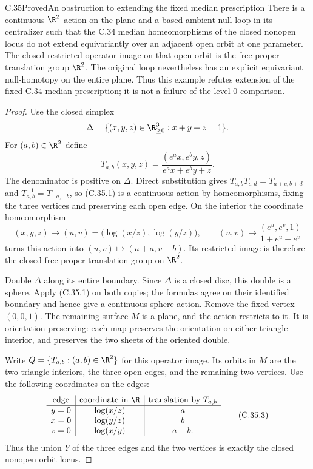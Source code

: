 \begin{claim}{C.35}{Proved}{An obstruction to extending the fixed median prescription}
There is a continuous $\R^2$-action on the plane and a based
ambient-null loop in its centralizer such that the C.34 median
homeomorphisms of the closed nonopen locus do not extend
equivariantly over an adjacent open orbit at one parameter.
The closed restricted operator image on that open orbit is
the free proper translation group $\R^2$.
The original loop nevertheless has an explicit equivariant
null-homotopy on the entire plane.
Thus this example refutes extension of the fixed C.34 median
prescription; it is not a failure of the level-$0$ comparison.
\end{claim}
\begin{proof}
Use the closed simplex
\[
 \Delta=\{(x,y,z)\in\R_{\geq0}^3:x+y+z=1\}.
\]
For $(a,b)\in\R^2$ define
\[
 T_{a,b}(x,y,z)
   =\frac{(e^a x,e^b y,z)}{e^a x+e^b y+z}.
                                                        \tag{C.35.1}
\]
The denominator is positive on $\Delta$.
Direct substitution gives
$T_{a,b}T_{c,d}=T_{a+c,b+d}$ and
$T_{a,b}^{-1}=T_{-a,-b}$, so (C.35.1) is a continuous
action by homeomorphisms, fixing the three vertices and
preserving each open edge.
On the interior the coordinate homeomorphism
\[
 (x,y,z)\longmapsto(u,v)=\bigl(\log(x/z),\log(y/z)\bigr),
 \qquad
 (u,v)\longmapsto
       \frac{(e^u,e^v,1)}{1+e^u+e^v}
                                                        \tag{C.35.2}
\]
turns this action into $(u,v)\mapsto(u+a,v+b)$.
Its restricted image is therefore the closed free proper
translation group on $\R^2$.

Double $\Delta$ along its entire boundary. Since $\Delta$
is a closed disc, this double is a sphere. Apply (C.35.1)
on both copies; the formulas agree on their identified
boundary and hence give a continuous sphere action.
Remove the fixed vertex $(0,0,1)$. The remaining surface
$M$ is a plane, and the action restricts to it.
It is orientation preserving: each map preserves the
orientation on either triangle interior, and preserves
the two sheets of the oriented double.

Write $Q=\{T_{a,b}:(a,b)\in\R^2\}$ for this operator
image. Its orbits in $M$ are the two triangle interiors,
the three open edges, and the remaining two vertices.
Use the following coordinates on the edges:
\[
\begin{array}{c|c|c}
 \text{edge}&\text{coordinate in }\R&
                      \text{translation by }T_{a,b}\\ \hline
 y=0&\log(x/z)&a\\
 x=0&\log(y/z)&b\\
 z=0&\log(x/y)&a-b .
\end{array}                                               \tag{C.35.3}
\]
Thus the union $Y$ of the three edges and the two
vertices is exactly the closed nonopen orbit locus.


\end{proof}
